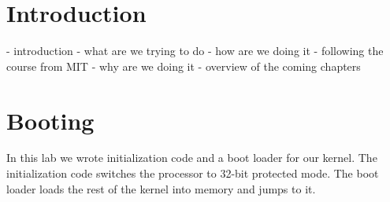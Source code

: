 \documentclass{report}
\begin{document}

\chapter{Introduction}


- introduction
	- what are we trying to do
	- how are we doing it
		- following the course from MIT
	- why are we doing it
	- overview of the coming chapters














\chapter{Booting}
\label{sec:lab1}

In this lab we wrote initialization code and a boot loader for our kernel. 
The initialization code switches the processor to 32-bit protected mode. The
boot loader loads the rest of the kernel into memory and jumps to it.
\end{document}
